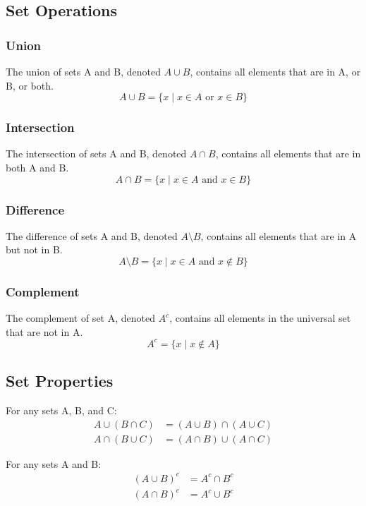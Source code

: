 \documentclass{article}
\begin{document}
\subsection{Set Operations}

\subsubsection{Union}
The union of sets A and B, denoted $A \cup B$, contains all elements that are in A, or B, or both.
$$A \cup B = \{x \mid x \in A \text{ or } x \in B\}$$

\subsubsection{Intersection}
The intersection of sets A and B, denoted $A \cap B$, contains all elements that are in both A and B.
$$A \cap B = \{x \mid x \in A \text{ and } x \in B\}$$

\subsubsection{Difference}
The difference of sets A and B, denoted $A \setminus B$, contains all elements that are in A but not in B.
$$A \setminus B = \{x \mid x \in A \text{ and } x \notin B\}$$

\subsubsection{Complement}
The complement of set A, denoted $A^c$, contains all elements in the universal set that are not in A.
$$A^c = \{x \mid x \notin A\}$$

\subsection{Set Properties}

\begin{theorem}
For any sets A, B, and C:
\begin{align*}
A \cup (B \cap C) &= (A \cup B) \cap (A \cup C) \\
A \cap (B \cup C) &= (A \cap B) \cup (A \cap C)
\end{align*}
\end{theorem}

\begin{theorem}
For any sets A and B:
\begin{align*}
(A \cup B)^c &= A^c \cap B^c \\
(A \cap B)^c &= A^c \cup B^c
\end{align*}
\end{theorem}
\end{document}
